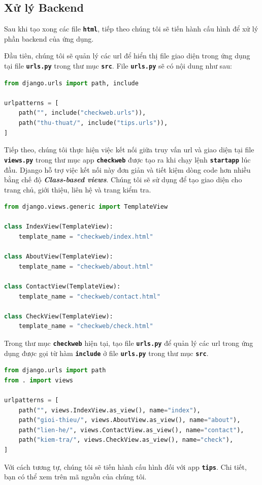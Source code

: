 \subsection{Xử lý Backend}
Sau khi tạo xong các file \textbf{\texttt{html}}, tiếp theo chúng tôi sẽ tiến hành cấu hình để xử lý phần backend của ứng dụng.
\par
Đầu tiên, chúng tôi sẽ quản lý các url để hiển thị file giao diện trong ứng dụng tại file \textbf{\texttt{urls.py}} trong thư mục \textbf{\texttt{src}}. File \textbf{\texttt{urls.py}} sẽ có nội dung như sau:
\begin{lstlisting}[language=Python]
from django.urls import path, include

urlpatterns = [
    path("", include("checkweb.urls")),
    path("thu-thuat/", include("tips.urls")),
]
\end{lstlisting}
\par
Tiếp theo, chúng tôi thực hiện việc kết nối giữa truy vấn url và giao diện tại file \textbf{\texttt{views.py}} trong thư mục app \textbf{\texttt{checkweb}} được tạo ra khi chạy lệnh \textbf{\texttt{startapp}} lúc đầu. Django hỗ trợ việc kết nối này đơn giản và tiết kiệm dòng code hơn nhiều bằng chế độ \textbf{\textit{Class-based views}}. Chúng tôi sẽ sử dụng để tạo giao diện cho trang chủ, giới thiệu, liên hệ và trang kiểm tra.
\begin{lstlisting}[language=Python]
from django.views.generic import TemplateView

class IndexView(TemplateView):
    template_name = "checkweb/index.html"

class AboutView(TemplateView):
    template_name = "checkweb/about.html"

class ContactView(TemplateView):
    template_name = "checkweb/contact.html"

class CheckView(TemplateView):
    template_name = "checkweb/check.html"
\end{lstlisting}
\par
Trong thư mục \textbf{\texttt{checkweb}} hiện tại, tạo file \textbf{\texttt{urls.py}} để quản lý các url trong ứng dụng được gọi từ hàm \textbf{\texttt{include}} ở file \textbf{\texttt{urls.py}} trong thư mục \textbf{\texttt{src}}.
\begin{lstlisting}[language=Python]
from django.urls import path
from . import views

urlpatterns = [
    path("", views.IndexView.as_view(), name="index"),
    path("gioi-thieu/", views.AboutView.as_view(), name="about"),
    path("lien-he/", views.ContactView.as_view(), name="contact"),
    path("kiem-tra/", views.CheckView.as_view(), name="check"),
]
\end{lstlisting}
\par
Với cách tương tự, chúng tôi sẽ tiến hành cấu hình đối với app \textbf{\texttt{tips}}. Chi tiết, bạn có thể xem trên mã nguồn của chúng tôi.
